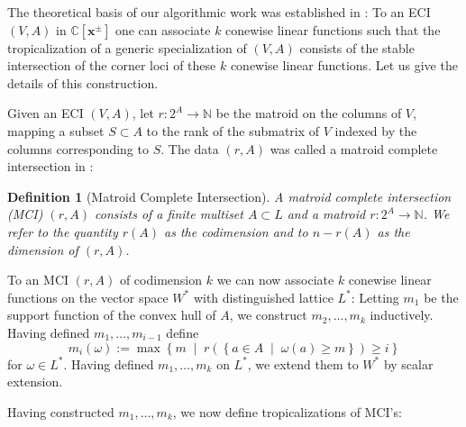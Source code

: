 \documentclass[a4paper]{article}
\newtheorem{definition}{Definition}
\theoremstyle{remark}
\newcommand{\setdes}[2]{\left\{#1\;\middle|\;#2\right\}}
\def\NN{\mathbb{N}}
\def\CC{\mathbb{C}}
\def\xx{\mathbf{x}}
\begin{document}
The theoretical basis of our algorithmic work was established in
\cite{esterovEngineeredCompleteIntersections2025,
  esterovEngineeredCompleteIntersections2024}: To an ECI $(V,A)$ in
$\CC[\xx^{\pm}]$ one can associate $k$ conewise linear functions such
that the tropicalization of a generic specialization of $(V,A)$
consists of the stable intersection of the corner loci of these $k$
conewise linear functions. Let us give the details of this
construction.

Given an ECI $(V,A)$, let $r:2^A\rightarrow \NN$ be the matroid on the columns
of $V$, mapping a subset $S\subset A$ to the rank of the submatrix of
$V$ indexed by the columns corresponding to $S$. The data $(r,A)$ was
called a matroid complete intersection in
\cite{esterovEngineeredCompleteIntersections2025,
  esterovEngineeredCompleteIntersections2024}:
\begin{definition}[Matroid Complete Intersection]
  A {\em matroid complete intersection} (MCI) $(r,A)$ consists of a
  finite multiset $A\subset L$ and a matroid $r:2^A\rightarrow \NN$. We refer to the
  quantity $r(A)$ as the {\em codimension} and to $n - r(A)$ as the
  {\em dimension} of $(r, A)$.
\end{definition}

To an MCI $(r,A)$ of codimension $k$ we can now associate $k$ conewise
linear functions on the vector space $W^{*}$ with distinguished
lattice $L^{*}$: Letting $m_1$ be the support function of the convex
hull of $A$, we construct $m_2,\hdots,m_k$ inductively. Having defined
$m_1,\hdots,m_{i-1}$ define
\[m_i(\omega) := \max\setdes{m}{r(\setdes{a\in A}{\omega(a)\geq m})\geq i}\] for
$\omega\in L^{*}$. Having defined $m_1,\hdots,m_k$ on $L^{*}$, we extend them
to $W^{*}$ by scalar extension.

Having constructed $m_1,\dots,m_k$, we now define tropicalizations
of MCI's:
\end{document}
